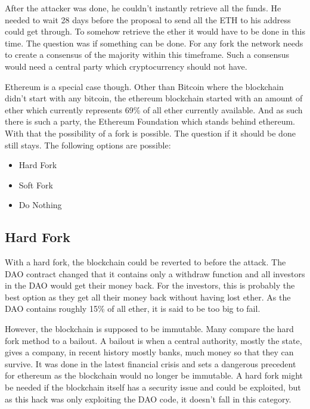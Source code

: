 \documentclass[a4paper, 11pt]{scrartcl}
\begin{document}
After the attacker was done, he couldn't instantly retrieve all the funds. He needed to wait 28 days before the proposal to send all the ETH to his address could get through. To somehow retrieve the ether it would have to be done in this time. The question was if something can be done. For any fork the network needs to create a consensus of the majority within this timeframe. Such a consensus would need a central party which cryptocurrency should not have. 

Ethereum is a special case though. Other than Bitcoin where the blockchain didn't start with any bitcoin, the ethereum blockchain started with an amount of ether which currently represents 69\% of all ether currently available. \cite{ethSupply} And as such there is such a party, the Ethereum Foundation which stands behind ethereum. \cite{eth} With that the possibility of a fork is possible. The question if it should be done still stays. The following options are possible:

\begin{itemize}
  \item Hard Fork
  \item Soft Fork
  \item Do Nothing
\end{itemize}

\subsection{Hard Fork}

With a hard fork, the blockchain could be reverted to before the attack. The DAO contract changed that it contains only a withdraw function and all investors in the DAO would get their money back. For the investors, this is probably the best option as they get all their money back without having lost ether. As the DAO contains roughly 15\% of all ether, it is said to be too big to fail. \cite{understandingDAO}

However, the blockchain is supposed to be immutable. Many compare the hard fork method to a bailout. A bailout is when a central authority, mostly the state, gives a company, in recent history mostly banks, much money so that they can survive. It was done in the latest financial crisis and sets a dangerous precedent for ethereum as the blockchain would no longer be immutable. A hard fork might be needed if the blockchain itself has a security issue and could be exploited, but as this hack was only exploiting the DAO code, it doesn't fall in this category. \cite{understandingDAO}
\end{document}
